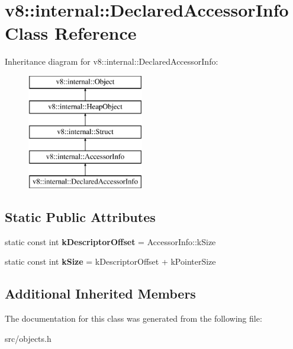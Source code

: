 \hypertarget{classv8_1_1internal_1_1_declared_accessor_info}{}\section{v8\+:\+:internal\+:\+:Declared\+Accessor\+Info Class Reference}
\label{classv8_1_1internal_1_1_declared_accessor_info}
Inheritance diagram for v8\+:\+:internal\+:\+:Declared\+Accessor\+Info\+:\begin{figure}[H]
\begin{center}
\leavevmode
\includegraphics[height=5.000000cm]{classv8_1_1internal_1_1_declared_accessor_info}
\end{center}
\end{figure}
\subsection*{Static Public Attributes}
\begin{DoxyCompactItemize}
\item 
\hypertarget{classv8_1_1internal_1_1_declared_accessor_info_a4e5c231ebfda3b4fa8d2887476b25184}{}static const int {\bfseries k\+Descriptor\+Offset} = Accessor\+Info\+::k\+Size\label{classv8_1_1internal_1_1_declared_accessor_info_a4e5c231ebfda3b4fa8d2887476b25184}

\item 
\hypertarget{classv8_1_1internal_1_1_declared_accessor_info_a218cdc7d726f6768d6ab66ea2e788dcc}{}static const int {\bfseries k\+Size} = k\+Descriptor\+Offset + k\+Pointer\+Size\label{classv8_1_1internal_1_1_declared_accessor_info_a218cdc7d726f6768d6ab66ea2e788dcc}

\end{DoxyCompactItemize}
\subsection*{Additional Inherited Members}


The documentation for this class was generated from the following file\+:\begin{DoxyCompactItemize}
\item 
src/objects.\+h\end{DoxyCompactItemize}
